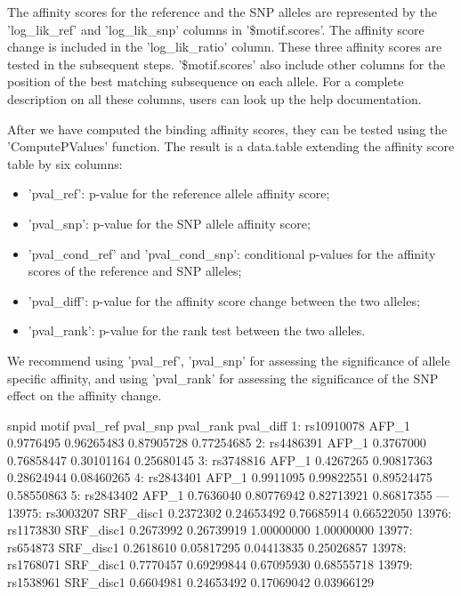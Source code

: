 \documentclass[a4paper,10pt]{article}
\begin{document}
The affinity scores for the reference and the SNP alleles are represented by the 'log\_lik\_ref' and 'log\_lik\_snp' columns in '\$motif.scores'. The affinity score change is included in the 'log\_lik\_ratio' column. These three affinity scores are tested in the subsequent steps. '\$motif.scores' also include other columns for the position of the best matching subsequence on each allele. For a complete description on all these columns, users can look up the help documentation.

After we have computed the binding affinity scores, they can be tested using the 'ComputePValues' function. The result is a data.table extending the affinity score table by six columns: 

\begin{itemize}
  \item 'pval\_ref': p-value for the reference allele affinity score;
  \item 'pval\_snp': p-value for the SNP allele affinity score;
  \item 'pval\_cond\_ref' and 'pval\_cond\_snp': conditional p-values for the affinity scores of the reference and SNP alleles;
  \item 'pval\_diff': p-value for the affinity score change between the two alleles;
  \item 'pval\_rank': p-value for the rank test between the two alleles.
  \end{itemize}

We recommend using 'pval\_ref', 'pval\_snp' for assessing the significance of allele specific affinity, and using 'pval\_rank' for assessing the significance of the SNP effect on the affinity change.

\begin{Schunk}
\begin{Soutput}
            snpid     motif  pval_ref   pval_snp  pval_rank  pval_diff
    1: rs10910078     AFP_1 0.9776495 0.96265483 0.87905728 0.77254685
    2:  rs4486391     AFP_1 0.3767000 0.76858447 0.30101164 0.25680145
    3:  rs3748816     AFP_1 0.4267265 0.90817363 0.28624944 0.08460265
    4:  rs2843401     AFP_1 0.9911095 0.99822551 0.89524475 0.58550863
    5:  rs2843402     AFP_1 0.7636040 0.80776942 0.82713921 0.86817355
   ---                                                                
13975:  rs3003207 SRF_disc1 0.2372302 0.24653492 0.76685914 0.66522050
13976:  rs1173830 SRF_disc1 0.2673992 0.26739919 1.00000000 1.00000000
13977:   rs654873 SRF_disc1 0.2618610 0.05817295 0.04413835 0.25026857
13978:  rs1768071 SRF_disc1 0.7770457 0.69299844 0.67095930 0.68555718
13979:  rs1538961 SRF_disc1 0.6604981 0.24653492 0.17069042 0.03966129
\end{Soutput}
\end{Schunk}
\end{document}
